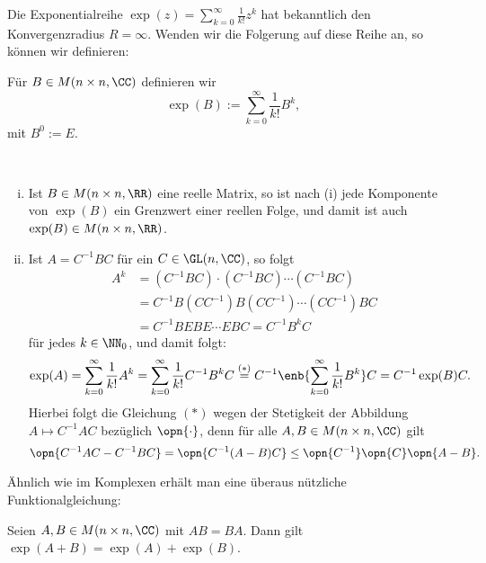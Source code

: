 Die Exponentialreihe $\exp(z) = \sum_{k=0}^{\infty} \frac{1}{k!} z^k$ hat bekanntlich den Konvergenzradius $R = \infty$.
Wenden wir die Folgerung auf diese Reihe an, so können wir definieren:

\begin{definition}
	\label{def:10.8}
	Für $B \in M(n \times n,\CC)$ definieren wir
	\[
	\exp(B) := \sum\limits_{k=0}^\infty \frac{1}{k!} B^k,
	\]
	mit $B^0 := E$. 
\end{definition}

\begin{bemerkung}
	\label{bem:10.9}
	\mbox{} \\[-1.4cm]
	\begin{enumerate}[(i)]
		\item Ist $B \in M(n \times n,\RR)$ eine reelle Matrix, so ist nach (i) jede Komponente von $\exp(B)$ ein Grenzwert einer reellen Folge, und damit ist auch $\exp(B) \in M(n \times n,\RR)$.
		\item Ist $A = C^{-1} BC$ für ein $C \in \GL(n,\CC)$, so folgt
		\begin{align*}
		A^{k} &= (C^{-1}BC)\cdot (C^{-1}BC) \cdots (C^{-1}BC) \\
		&= C^{-1} B (CC^{-1}) B (CC^{-1}) \cdots (CC^{-1})BC \\
		&= C^{-1} B E B E \cdots E BC = C^{-1} B^k C
		\end{align*}
		für jedes $k \in \NN_0$, und damit folgt:
		\[
			\exp(A) = \sum\limits_{k=0}^{\infty} \frac{1}{k!} A^k = \sum_{k=0}^{\infty} \frac{1}{k!} C^{-1} B^{k} C \stackrel{(*)}{=} C^{-1} \enb{\sum_{k=0}^{\infty} \frac{1}{k!} B^{k}} C = C^{-1} \exp(B) C.
		\]
		Hierbei folgt die Gleichung $(*)$ wegen der Stetigkeit der Abbildung $A \mapsto C^{-1} AC$ bezüglich $\opn{\cdot}$, denn für alle $A,B \in M(n \times n,\CC)$ gilt
		\[
			\opn{C^{-1}AC - C^{-1}BC} = \opn{C^{-1}(A-B)C} \leq \opn{C^{-1}} \opn{C} \opn{A-B}.
		\]
	\end{enumerate}
\end{bemerkung}

Ähnlich wie im Komplexen erhält man eine überaus nützliche Funktionalgleichung:

\begin{lemma}
	\label{lemma:10.10}
	Seien $A,B \in M(n \times n,\CC)$ mit $AB = BA$.
	Dann gilt $\exp(A+B) = \exp(A) + \exp(B)$.
\end{lemma}

